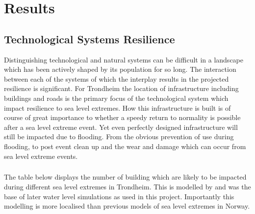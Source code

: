 \chapter{Results}

\section{Technological Systems Resilience}

Distinguishing technological and natural systems can be difficult in a landscape which has been actively shaped by its population for so long. The interaction between each of the systems of which the interplay results in the projected resilience is significant. For Trondheim the location of infrastructure including buildings and roads is the primary focus of the technological system which impact resilience to sea level extremes. How this infrastructure is built is of course of great importance to whether a speedy return to normality is possible after a sea level extreme event. Yet even perfectly designed infrastructure will still be impacted due to flooding. From the obvious  prevention of use during flooding, to post event clean up and the wear and damage which can occur from sea level extreme events.
\paragraph{}
The table below displays the number of building which are likely to be impacted during different sea level extremes in Trondheim. This is modelled by \cite{kartverket_se_2021} and was the base of later water level simulations as used in this project. Importantly this modelling is more localised than previous models of sea level extremes in Norway. 


